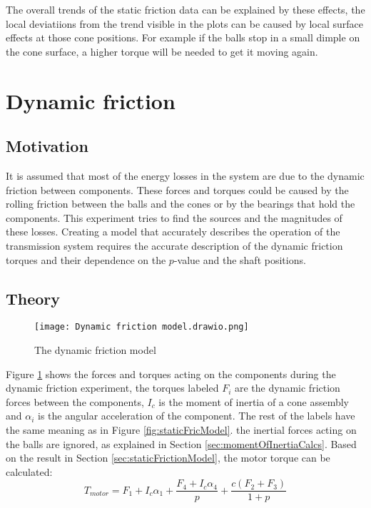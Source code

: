 \documentclass[12pt]{article}
\begin{document}
The overall trends of the static friction data can be explained by these effects, the local deviatiions from the trend visible in the plots can be caused by local surface effects at those cone positions. For example if the balls stop in a small dimple on the cone surface, a higher torque will be needed to get it moving again.



\pagebreak

\section{Dynamic friction}
\subsection{Motivation}
It is assumed that most of the energy losses in the system are due to the dynamic friction between components. These forces and torques could be caused by the rolling friction between the balls and the cones or by the bearings that hold the components. This experiment tries to find the sources and the magnitudes of these losses. Creating a model that accurately describes the operation of the transmission system requires the accurate description of the dynamic friction torques and their dependence on the $p$-value and the shaft positions.



\subsection{Theory}
\begin{figure}[h]
    \centering
    \texttt{[image: Dynamic friction model.drawio.png]}
    \caption{The dynamic friction model}
    \label{fig:dynFricModel}
\end{figure}
Figure \ref{fig:dynFricModel} shows the forces and torques acting on the components during the dynamic friction experiment, the torques labeled $F_i$ are the dynamic friction forces between the components, $I_c$ is the moment of inertia of a cone assembly and $\alpha_i$ is the angular acceleration of the component. The rest of the labels have the same meaning as in Figure \ref{fig:staticFricModel}. the inertial forces acting on the balls are ignored, as explained in Section \ref{sec:momentOfInertiaCalcs}. 
Based on the result in Section \ref{sec:staticFrictionModel}, the motor torque can be calculated:
$$T_{motor} = F_1 + I_c\alpha_1 + \frac{F_4 + I_c \alpha_4 }{p} + \frac{c(F_2+F_3)}{1+p}$$
\end{document}
